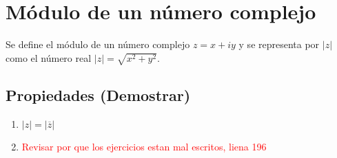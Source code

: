\documentclass{article}
\theoremstyle{definition}
\begin{document}
    \section{Módulo de un número complejo}
    Se define el módulo de un número complejo $z = x + iy$ y se representa por $|z|$ como el número real $|z| = \sqrt{x^{2}+y^{2}}$.
    \subsection{Propiedades (Demostrar)}
    \begin{enumerate}
        \item $|z| = |\overline{z}|$
        \item \textcolor{red}{Revisar por que los ejercicios estan mal escritos, liena 196}
    \end{enumerate}
\end{document}
